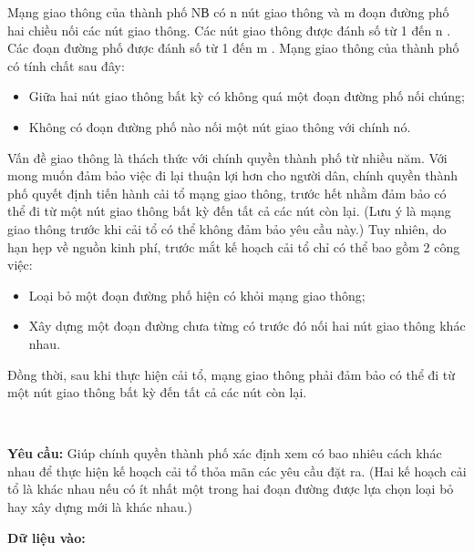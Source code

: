 

Mạng giao thông của thành phố NВ có n nút giao thông và m đoạn đường phố hai chiều nối các nút giao thông. Các nút giao thông được đánh số từ 1 đến n . Các đoạn đường phố được đánh số từ 1 đến m . Mạng giao thông của thành phố có tính chất sau đây:
\begin{itemize}
	\item Giữa hai nút giao thông bất kỳ có không quá một đoạn đường phố nối chúng;
	\item Không có đoạn đường phố nào nối một nút giao thông với chính nó.
\end{itemize}

Vấn đề giao thông là thách thức với chính quyền thành phố từ nhiều năm. Với mong muốn đảm bảo việc đi lại thuận lợi hơn cho người dân, chính quyền thành phố quyết định tiến hành cải tổ mạng giao thông, trước hết nhằm đảm bảo có thể đi từ một nút giao thông bất kỳ đến tất cả các nút còn lại. (Lưu ý là mạng giao thông trước khi cải tổ có thể không đảm bảo yêu cầu này.) Tuy nhiên, do hạn hẹp về nguồn kinh phí, trước mắt kế hoạch cải tổ chỉ có thể bao gồm 2 công việc:
\begin{itemize}
	\item Loại bỏ một đoạn đường phố hiện có khỏi mạng giao thông;
	\item Xây dựng một đoạn đường chưa từng có trước đó nối hai nút giao thông khác nhau.
\end{itemize}

Đồng thời, sau khi thực hiện cải tổ, mạng giao thông phải đảm bảo có thể đi từ một nút giao thông bất kỳ đến tất cả các nút còn lại.

 

\textbf{Yêu }\textbf{}\textbf{ cầu: }\textbf{} Giúp chính quyền thành phố xác định xem có bao nhiêu cách khác nhau để thực hiện kế hoạch cải tổ thỏa mãn các yêu cầu đặt ra. (Hai kế hoạch cải tổ là khác nhau nếu có ít nhất một trong hai đoạn đường được lựa chọn loại bỏ hay xây dựng mới là khác nhau.)

\textbf{Dữ liệu vào: }

